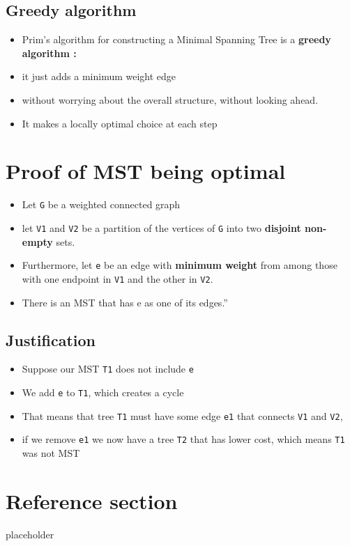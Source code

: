 \documentclass{article}
\begin{document}
\subsection{Greedy algorithm}
\begin{itemize}
	\item Prim’s algorithm for constructing a Minimal Spanning Tree is a \textbf{greedy algorithm :}
	\item it just adds a minimum weight edge
	\item without worrying about the overall structure, without looking ahead.
	\item It makes a locally optimal choice at each step
\end{itemize}

\section{Proof of MST being optimal}

\begin{itemize}
	\item Let \texttt{G} be a weighted connected graph
	\item let \texttt{V1} and \texttt{V2} be a partition of the vertices of \texttt{G} into two \textbf{disjoint non-empty} sets.
	\item Furthermore, let \texttt{e} be an edge with \textbf{minimum weight} from among those with one endpoint in \texttt{V1} and the other in \texttt{V2}.
	\item There is an MST that has e as one of its edges.”
\end{itemize}

\subsection{Justification}
\begin{itemize}
	\item Suppose our MST \texttt{T1} does not include \texttt{e}
	\item We add \texttt{e} to \texttt{T1}, which creates a cycle
	\item That means that tree \texttt{T1} must have some edge  \texttt{e1} that connects \texttt{V1} and \texttt{V2}, 
	\item if we remove \texttt{e1} we now have a tree \texttt{T2} that has lower cost, which means \texttt{T1} was not MST
\end{itemize}

\pagebreak
\section*{Reference section} \label{sec:reference}
\begin{description}
	\item[placeholder] \hfill \\
\end{description}
\end{document}
